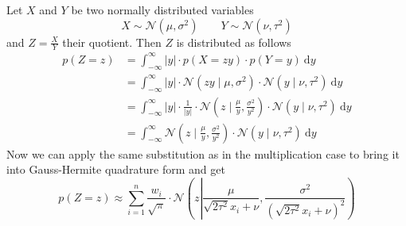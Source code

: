 \documentclass[11pt,a4paper]{book}
\begin{document}
Let $X$ and $Y$ be two normally distributed variables
\begin{equation*}
  X \sim \mathcal{N}(\mu, \sigma^{2}) \qquad Y \sim \mathcal{N}(\nu, \tau^{2})
\end{equation*}
and $Z = \frac{X}{Y}$ their quotient. Then $Z$ is distributed as follows
\begin{align*}
  p(Z = z) & = \int_{-\infty}^{\infty} |y| \cdot p\left(X = zy\right) \cdot p(Y = y)~\mathrm{d}y\\
           & = \int_{-\infty}^{\infty} |y| \cdot \mathcal{N}\left( zy \mid \mu, \sigma^{2} \right) \cdot \mathcal{N}(y \mid \nu, \tau^{2})~\mathrm{d}y\\
           & = \int_{-\infty}^{\infty} |y| \cdot \frac{1}{|y|} \cdot \mathcal{N}\left( z \mid \frac{\mu}{y}, \frac{\sigma^{2}}{y^{2}} \right) \cdot \mathcal{N}(y \mid \nu, \tau^{2})~\mathrm{d}y\\
           & = \int_{-\infty}^{\infty} \mathcal{N}\left( z \mid \frac{\mu}{y}, \frac{\sigma^{2}}{y^{2}} \right) \cdot \mathcal{N}(y \mid \nu, \tau^{2})~\mathrm{d}y
\end{align*}
Now we can apply the same substitution as in the multiplication case to bring it
into Gauss-Hermite quadrature form and get
\begin{equation*}
  p(Z = z) \approx \sum_{i = 1}^{n} \frac{w_{i}}{\sqrt{\pi}} \cdot \mathcal{N}\left( z \left| \frac{\mu}{\sqrt{2 \tau^{2}} x_{i} + \nu}, \frac{\sigma^{2}}{\left(\sqrt{2 \tau^{2}} x_{i} + \nu\right)^{2}} \right.\right)
\end{equation*}
\end{document}
